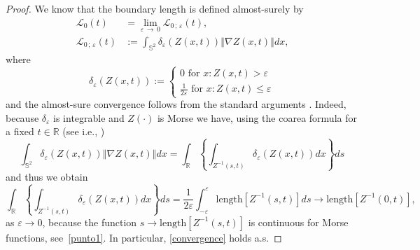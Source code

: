 \documentclass[10pt]{amsart}
\theoremstyle{definition}\newtheorem{defi}[theo]{Definition}\newtheorem{rema}[theo]{Remark}\newtheorem{exam}[theo]{Example}\newtheorem{exem}[theo]{Example}\newtheorem{nota}[theo]{Notation}
\newcommand{\clL}{\mathcal{L}}
\newcommand{\bbS}{\mathbb{S}}
\newcommand{\bbR}{\mathbb{R}}
\begin{document}
\begin{proof}
We know that the boundary length is defined almost-surely by
\begin{align*}
\clL_{0}(t) &\mathcal{=}\lim_{\varepsilon\,\rightarrow\,0}\clL _{0\,;\,\varepsilon }(t)\text{, } \\
\clL_{0\,;\,\varepsilon }(t) &:=\int_{\bbS^{2}}\delta _{\varepsilon }(Z(x,t))\left\Vert \nabla Z(x,t)\right\Vert dx\text{,}
\end{align*}
where
\begin{equation*}
\delta _{\varepsilon }(Z(x,t)):=\left\{
\begin{array}{c}
0\text{ for }x:Z(x,t)>\varepsilon \\
\frac{1}{2\varepsilon }\text{ for }x:Z(x,t)\leq \varepsilon
\end{array}
\right.
\end{equation*}
and the almost-sure convergence follows from the standard arguments \cite[Lem\-ma~3.1]{RW08}. Indeed, because $\delta _{\varepsilon }$ is integrable and $Z(\cdot)$ is Morse we have, using the coarea formula for a fixed $t\in
\bbR$ (see i.e., \cite[p.~169]{adlertaylor})
\begin{equation*}
\int_{\bbS^{2}}\delta_{\varepsilon }(Z(x,t))\left\Vert \nabla Z(x,t)\right\Vert dx=\int_{\bbR}\left\{ \int_{Z^{-1}(s,t)}\delta_{\varepsilon }(Z(x,t))dx\right\} ds
\end{equation*}
and thus we obtain
\begin{equation*}
\int_{\bbR}\left\{ \int_{Z^{-1}(s,t)}\delta_{\varepsilon }(Z(x,t))dx\right\} ds=\frac{1}{2\varepsilon }\int_{-\varepsilon }^{\varepsilon }\textrm{length}\left[Z^{-1}(s,t)\right] ds\rightarrow \textrm{length}\left[Z^{-1}(0,t)\right],
\end{equation*}
as $\varepsilon \rightarrow 0$, because the function $s\rightarrow \textrm{length}[Z^{-1}(s,t)] $ is continuous for Morse functions, see~\ref{punto1}. In particular, \eqref{convergence} holds a.s.


\end{proof}
\end{document}
